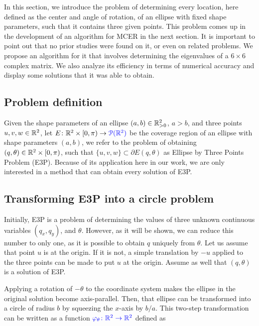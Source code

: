 In this section, we introduce the problem of determining every location, here defined as the center and angle of rotation, of an ellipse with fixed shape parameters, such that it contains three given points.
This problem comes up in the development of an algorithm for MCER in the next section. 
It is important to point out that no prior studies were found on it, or even on related problems.
We propose an algorithm for it that involves determining the eigenvalues of a $6\times6$ complex matrix. We also analyze its efficiency in terms of numerical accuracy and display some solutions that it was able to obtain.

\subsection{Problem definition}

Given the shape parameters of an ellipse $(a, b) \in \mathbb{R}^2_{>0}$, $a > b$, and three points $u, v, w \in \mathbb{R}^2$, let $E\colon \mathbb{R}^2\times [0, \pi)\to{\color{blue}\mathcal{P}(\mathbb{R}^2)}$ be the coverage region of an ellipse with shape parameters $(a, b)$, we refer to the problem of obtaining $(q, \theta) \in \mathbb{R}^2\times [0, \pi)$, such that $\{u, v, w\} \subset \partial E(q, \theta)$ as Ellipse by Three Points Problem (E3P).
Because of its application here in our work, we are only interested in a method that can obtain every solution of E3P.

\subsection{Transforming E3P into a circle problem}

Initially, E3P is a problem of determining the values of three unknown continuous variables $(q_x, q_y)$, and $\theta$. However, as it will be shown, we can reduce this number to only one, as it is possible to obtain $q$ uniquely from $\theta$.
Let us assume that point $u$ is at the origin. If it is not, a simple translation by $-u$ applied to the three points can be made to put $u$ at the origin.
Assume as well that $(q, \theta)$ is a solution of E3P. 

Applying a rotation of $-\theta$ to the coordinate system makes the ellipse in the original solution become axis-parallel.
Then, that ellipse can be transformed into a circle of radius $b$ by squeezing the $x$-axis by $b/a$. This two-step transformation can be written as a function ${\color{blue}\varphi_\theta\colon \mathbb{R}^2 \to \mathbb{R}^2}$ defined as

